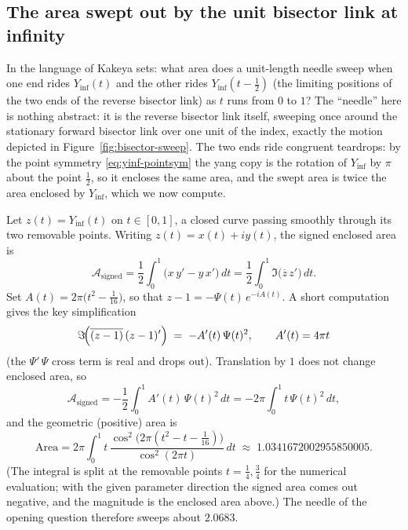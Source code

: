 \documentclass[11pt]{article}
\theoremstyle{definition}
\begin{document}
\subsection{The area swept out by the unit bisector link at infinity}\label{sec:yinyang-area}

In the language of Kakeya sets: what area does a unit-length needle sweep when
one end rides $Y_{\inf}(t)$ and the other rides $Y_{\inf}(t-\tfrac12)$ (the
limiting positions of the two ends of the reverse bisector link) as $t$
runs from $0$ to $1$? The ``needle'' here is nothing abstract: it is the
reverse bisector link itself, sweeping once around the stationary forward
bisector link over one unit of the index, exactly the motion depicted in
Figure~\ref{fig:bisector-sweep}. The two ends ride congruent teardrops: by
the point symmetry \eqref{eq:yinf-pointsym} the yang copy is the rotation
of $Y_{\inf}$ by $\pi$ about the point $\tfrac12$, so it encloses the same
area, and the swept area is twice the area enclosed by $Y_{\inf}$, which we
now compute.

Let $z(t)=Y_{\inf}(t)$ on $t\in[0,1]$, a closed curve passing smoothly through
its two removable points. Writing $z(t)=x(t)+iy(t)$, the signed enclosed area
is
\begin{equation}\label{eq:area-def}
\mathcal A_{\mathrm{signed}}
=\frac12\int_{0}^{1}\bigl(x\,y'-y\,x'\bigr)\,dt
=\frac12\int_{0}^{1}\Im\!\bigl(\overline{z}\,z'\bigr)\,dt .
\end{equation}
Set $A(t)=2\pi\bigl(t^{2}-\tfrac{1}{16}\bigr)$, so that
$z-1=-\Psi(t)\,e^{-iA(t)}$. A short computation gives the key simplification
\begin{equation}\label{eq:area-key}
\Im\!\Bigl(\overline{(z-1)}\,(z-1)'\Bigr)
\;=\;
-A'(t)\,\Psi(t)^{2},
\qquad A'(t)=4\pi t
\end{equation}
(the $\Psi'\,\Psi$ cross term is real and drops out). Translation by $1$ does
not change enclosed area, so
\begin{equation}\label{eq:area-signed}
\mathcal A_{\mathrm{signed}}
=-\frac12\int_{0}^{1}A'(t)\,\Psi(t)^{2}\,dt
=-2\pi\int_{0}^{1}t\,\Psi(t)^{2}\,dt ,
\end{equation}
and the geometric (positive) area is
\begin{equation}\label{eq:area-value}
\boxed{\;
\mathrm{Area}
=2\pi\int_{0}^{1}t\,
\frac{\cos^{2}\!\bigl(2\pi(t^{2}-t-\tfrac{1}{16})\bigr)}{\cos^{2}(2\pi t)}
\,dt
\;\approx\;
1.0341672002955850005 .\;}
\end{equation}
(The integral is split at the removable points $t=\tfrac14,\tfrac34$ for the
numerical evaluation; with the given parameter direction the signed area comes
out negative, and the magnitude is the enclosed area above.) The needle of the
opening question therefore sweeps about $2.0683$.
\end{document}
